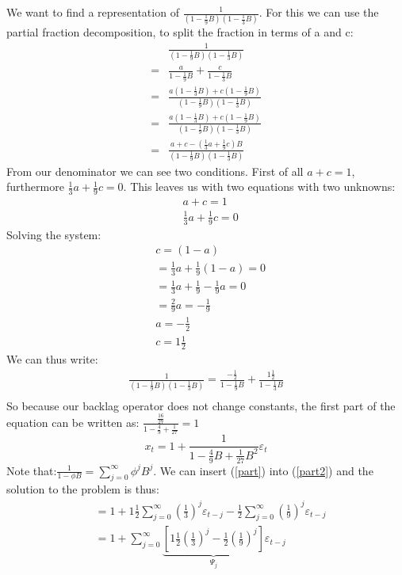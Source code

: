 \documentclass{article}
\begin{document}
We want to find a representation of $\frac{1}{(1-\frac{1}{9}B)(1-\frac{1}{3}B)}$. For this we can use the partial fraction decomposition, to split the fraction in terms of a and c: 
\begin{align*}
& \frac{1}{(1-\frac{1}{9}B)(1-\frac{1}{3}B)}\\
= & \frac{a}{1-\frac{1}{9}B}+\frac{c}{1-\frac{1}{3}B}\\
= & \frac{a(1-\frac{1}{3}B)+c(1-\frac{1}{9}B)}{(1-\frac{1}{9}B)(1-\frac{1}{3}B) }\\
= & \frac{a(1-\frac{1}{3}B)+c(1-\frac{1}{9}B)}{(1-\frac{1}{9}B)(1-\frac{1}{3}B) }\\
= & \frac{a+c-(\frac{1}{3}a+\frac{1}{9}c)B}{(1-\frac{1}{9}B)(1-\frac{1}{3}B) }
\end{align*}  
From our denominator we can see two conditions. First of all $a+c=1$, furthermore $\frac{1}{3}a+\frac{1}{9}c=0$. This leaves us with two equations with two unknowns: 
\begin{align*}
& a+c=1\\
& \frac{1}{3}a+\frac{1}{9}c=0
\end{align*}
Solving the system: 
\begin{align*}
& c=(1-a)\\
& =\frac{1}{3}a+\frac{1}{9}(1-a)=0\\
& = \frac{1}{3}a+\frac{1}{9}-\frac{1}{9}a=0\\
& = \frac{2}{9}a=-\frac{1}{9}\\
& a=-\frac{1}{2}\\
& c=1\frac{1}{2}
\end{align*}
We can thus write: 
\begin{align}\label{part}
\frac{1}{(1-\frac{1}{9}B)(1-\frac{1}{3}B)}=\frac{-\frac{1}{2}}{1-\frac{1}{9}B}+\frac{1\frac{1}{2}}{1-\frac{1}{3}B}\\
\end{align}
So because our backlag operator does not change constants, the first part of the equation can be written as: $\frac{\frac{16}{27}}{1-\frac{4}{9}+\frac{1}{27}}=1$
\begin{equation}\label{part2}
x_t=1+\frac{1}{1-\frac{4}{9}B+\frac{1}{27}B^2}\varepsilon_t
\end{equation}
Note that:$\frac{1}{1-\phi B}=\sum_{j=0}^\infty \phi^j B^j$. We can insert (\ref{part}) into (\ref{part2}) and the solution to the problem is thus: 
\begin{align*}
& =1+1\frac{1}{2}\sum^\infty_{j=0}(\frac{1}{3})^j\varepsilon_{t-j}-\frac{1}{2}\sum^\infty_{j=0}(\frac{1}{9})^j\varepsilon_{t-j}\\
& =1+\sum^\infty_{j=0}\underbrace{[1\frac{1}{2}(\frac{1}{3})^j-\frac{1}{2}(\frac{1}{9})^j]}_{\text{$\Psi_j$}}\varepsilon_{t-j}
\end{align*}
\end{document}
